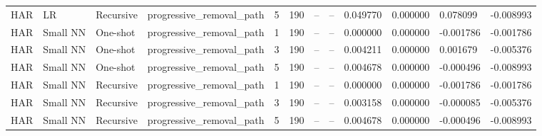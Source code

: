 \begin{table}[t]
\begin{tabular}{llllllllllll}
HAR & LR & Recursive & progressive\_removal\_path & 5 & 190 & -- & -- & 0.049770 & 0.000000 & 0.078099 & -0.008993 \\
HAR & Small NN & One-shot & progressive\_removal\_path & 1 & 190 & -- & -- & 0.000000 & 0.000000 & -0.001786 & -0.001786 \\
HAR & Small NN & One-shot & progressive\_removal\_path & 3 & 190 & -- & -- & 0.004211 & 0.000000 & 0.001679 & -0.005376 \\
HAR & Small NN & One-shot & progressive\_removal\_path & 5 & 190 & -- & -- & 0.004678 & 0.000000 & -0.000496 & -0.008993 \\
HAR & Small NN & Recursive & progressive\_removal\_path & 1 & 190 & -- & -- & 0.000000 & 0.000000 & -0.001786 & -0.001786 \\
HAR & Small NN & Recursive & progressive\_removal\_path & 3 & 190 & -- & -- & 0.003158 & 0.000000 & -0.000085 & -0.005376 \\
HAR & Small NN & Recursive & progressive\_removal\_path & 5 & 190 & -- & -- & 0.004678 & 0.000000 & -0.000496 & -0.008993 \\
\hline
\end{tabular}
\end{table}
